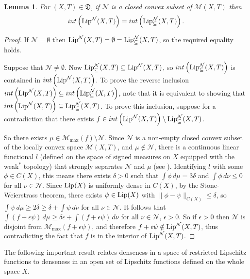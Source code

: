 \documentclass[reqno,11pt]{amsart}
\newtheorem{lem}[thm]{Lemma}
\theoremstyle{definition}
\theoremstyle{remark}
\theoremstyle{remark}
\def\m{\mathcal M}
\def\n{\mathcal N}
\def\lip{{\rm Lip}}
\def\D{\mathfrak{D}}
\numberwithin{equation}{section}
\begin{document}
\begin{lem}\label{Nclosedconvexsameinteriors}
For $(X,T)\in\D$,
if $\n$ is a closed convex subset of $\m(X,T)$
then
$$
int\left(\lip^\n(X,T) \right) = int\left( \lip_\subseteq^\n(X,T) \right) .
$$
\end{lem}
\begin{proof}
If $\n=\emptyset$ then $\lip^\n(X,T)=\emptyset=\lip^\n_\subseteq(X,T)$, so the required equality holds.

Suppose that $\n\neq\emptyset$.
Now $ \lip_\subseteq^\n(X,T) \subseteq \lip^\n(X,T)$,
so
 $ int\left(\lip_\subseteq^\n(X,T)\right)$ is contained in $int\left(\lip^\n(X,T)\right)$.
To prove the reverse inclusion 
$
int\left(\lip^\n(X,T) \right) \subseteq int\left( \lip_\subseteq^\n(X,T) \right)
$, 
note that it is equivalent to showing that
$
int\left(\lip^\n(X,T) \right) \subseteq  \lip_\subseteq^\n(X,T)
$. 
To prove this inclusion,
suppose
for a contradiction that there exists  
$f\in  int\left(\lip^\n(X,T)\right) \setminus  \lip_\subseteq^\n(X,T)$.

So there exists $\mu\in\m_{\max}(f)\setminus \n$.
Since $\n$ is a non-empty closed convex subset of the locally convex space $\m(X,T)$, and $\mu\notin\n$,
there is a continuous linear functional $l$ 
(defined on the space of signed measures on $X$ equipped with the weak$^*$ topology)
that strongly separates $\n$ and $\mu$ (see \cite[Cor.~5.59]{AB99}).
Identifying $l$ with some $\phi\in C(X)$,
this means
there exists $\delta>0$ such that $\int \phi\, d\mu =3\delta$ and $\int \phi\, d\nu\le 0$ for all $\nu\in\n$.
Since $\lip(X)$ is uniformly dense in $C(X)$, 
by the Stone-Weierstrass theorem,
there exists $\psi\in \lip(X)$ with $\|\phi-\psi\|_{C(X)}\le\delta$,
so $\int \psi\, d\mu \ge 2\delta\ge \delta +\int\psi\, d\nu$ for all $\nu\in\n$.
It follows that
$\int (f+\epsilon\psi)\, d\mu \ge \delta\epsilon + \int (f+\epsilon\psi)\, d\nu$  for all $\nu\in\n$, $\epsilon>0$.
So if $\epsilon>0$ then $\n$ is disjoint from $\m_{\max}(f+\epsilon\psi)$,
and therefore $f+\epsilon\psi \notin \lip^\n(X,T)$,
thus contradicting the fact that
$f$ is in the interior of $\lip^\n(X,T)$.
\end{proof}

The following important result relates denseness in a space of restricted Lipschitz functions to denseness in an open set of Lipschitz functions defined on the whole space $X$.
\end{document}
